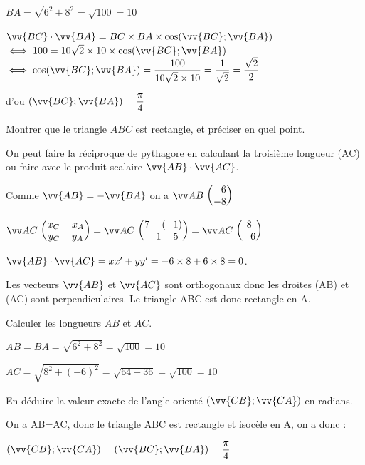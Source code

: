 \documentclass[12pt,a4paper]{article}  %
\begin{document}
\begin{enumMet}
\begin{enumMet}
\begin{corrBox}
			$BA=\sqrt{6^2+8^2}=\sqrt{100}=10$
			
			$\vv{B C} \cdot \vv{B A}=BC\times BA\times \cos( \vv{B C} ; \vv{B A} )$
			$\iff 100=10\sqrt{2}\times 10\times \cos( \vv{B C} ; \vv{B A} )$
			$\iff \cos( \vv{B C} ; \vv{B A} )=\dfrac{100}{10\sqrt{2}\times 10}=\dfrac{1}{\sqrt{2}}=\dfrac{\sqrt{2}}{2}$
			
			d'ou $( \vv{B C} ; \vv{B A} )=\dfrac{\pi}{4}$		
		\end{corrBox}
	\end{enumMet}
	\item Montrer que le triangle $A B C$ est rectangle, et préciser en quel point.
	\begin{corrBox}
		On peut faire la réciproque de pythagore en calculant la troisième longueur (AC) ou faire avec le produit scalaire $\vv{AB} \cdot \vv{AC}$.
		
		Comme $\vv{AB}=-\vv{BA}$ on a $\Coord{AB}{-6}{-8}$
		
		$\Coord{AC}{x_C-x_A}{y_C-y_A}=\Coord{AC}{7-(-1)}{-1-5}=\Coord{AC}{8}{-6}$
		
		$\vv{AB} \cdot \vv{AC}=xx'+yy'=-6\times 8+6\times 8=0$.
		
		Les vecteurs $\vv{AB}$ et $\vv{AC}$ sont orthogonaux donc les droites (AB) et (AC) sont perpendiculaires. Le triangle ABC est donc rectangle en A.		
	\end{corrBox}
	\item \begin{enumMet}
		\item Calculer les longueurs $A B$ et $A C$.
		\begin{corrBox}
			$AB=BA=\sqrt{6^2+8^2}=\sqrt{100}=10$
			
			$AC=\sqrt{8^2+(-6)^2}=\sqrt{64+36}=\sqrt{100}=10$		
		\end{corrBox}
		\item En déduire la valeur exacte de l'angle orienté $(\vv{C B} ; \vv{C A})$ en radians.
		\begin{corrBox}
			On a AB=AC, donc le triangle ABC est rectangle et isocèle en A, on a donc :
			
			$(\vv{C B} ; \vv{C A})=( \vv{B C} ; \vv{B A} )=\dfrac{\pi}{4}$ 		
		\end{corrBox}
	\end{enumMet}
\end{enumMet}
\end{document}
